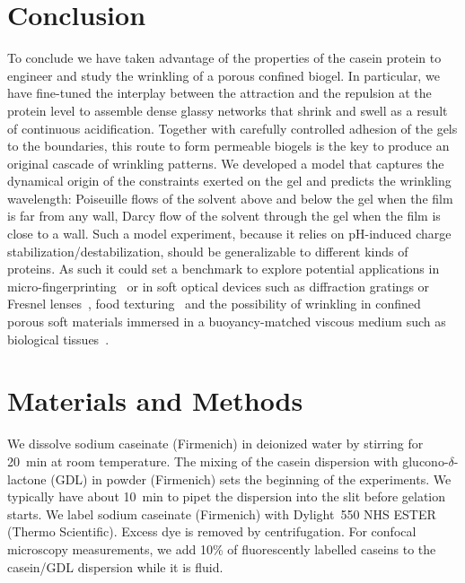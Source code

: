 \documentclass[twocolumn,superscriptaddress,showpacs,preprintnumbers, amsmath,amssymb,prl]{revtex4-1}
\begin{document}
\section*{Conclusion}

To conclude we have taken advantage of the properties of the casein protein to engineer and study the wrinkling of a porous confined biogel. In particular, we have fine-tuned the interplay between the attraction and the repulsion at the protein level to assemble dense glassy networks that shrink and swell as a result of continuous acidification. Together with carefully controlled adhesion of the gels to the boundaries, this route to form permeable biogels is the key to produce an original cascade of wrinkling patterns. We developed a model that captures the dynamical origin of the constraints exerted on the gel and predicts the wrinkling wavelength: Poiseuille flows of the solvent above and below the gel when the film is far from any wall, Darcy flow of the solvent through the gel when the film is close to a wall. Such a model experiment, because it relies on pH-induced charge stabilization/destabilization, should be generalizable to different kinds of proteins. As such it could set a benchmark to explore potential applications in micro-fingerprinting~\cite{Bae2015} or in soft optical devices such as diffraction gratings or Fresnel lenses~\cite{Li2013}, food texturing~\cite{Mezzenga2005,Gibaud2012a} and the possibility of wrinkling in confined porous soft materials immersed in a buoyancy-matched viscous medium such as biological tissues~\cite{Ma2004,Longley2013,Fleury2015}.



\section*{Materials and Methods}

We dissolve sodium caseinate (Firmenich) in deionized water by stirring for \SI{20}{\minute} at room temperature. The mixing of the casein dispersion with glucono-$\delta$-lactone (GDL) in powder (Firmenich) sets the beginning of the experiments. We typically have about \SI{10}{\minute} to pipet the dispersion into the slit before gelation starts. We label sodium caseinate (Firmenich) with Dylight~550 NHS ESTER (Thermo Scientific). Excess dye is removed by centrifugation. For confocal microscopy measurements, we add 10\% of fluorescently labelled caseins to the casein/GDL dispersion while it is fluid.
\end{document}
